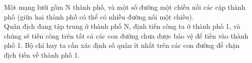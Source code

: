 Một mạng lưới gồm N thành phố, và một số đường một chiều nối các cặp thành phố (giữa hai thành phố có thể có nhiều đường nối một chiều).   
\\   Quân địch đang tập trung ở thành phố N, định tiến công ta ở thành phố 1, và chúng sẽ tiến công trên tất cả các con đường chưa được bảo vệ để tiến vào thành phố 1. Bộ chỉ huy ta cần xác định số quân ít nhất trên các con đường để chặn địch tiến về thành phố 1.  

\